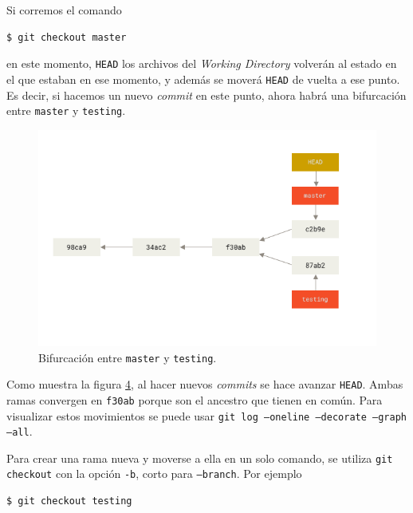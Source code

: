 \documentclass[spanish, 12pt, a4paper]{article}
\begin{document}
Si corremos el comando

\begin{lstlisting}
$ git checkout master
\end{lstlisting}

en este momento, \passthrough{\lstinline!HEAD!} los archivos del
\emph{Working Directory} volverán al estado en el que estaban en ese
momento, y además se moverá \passthrough{\lstinline!HEAD!} de vuelta a
ese punto. Es decir, si hacemos un nuevo \emph{commit} en este punto,
ahora habrá una bifurcación entre \passthrough{\lstinline!master!} y
\passthrough{\lstinline!testing!}.

\begin{figure}
\centering
\includegraphics{figs/advance-master.png}
\caption{Bifurcación entre \passthrough{\lstinline!master!} y
\passthrough{\lstinline!testing!}.{}}
\end{figure}

Como muestra la figura \protect\hyperlink{fig:bifurcacion}{4}, al hacer
nuevos \emph{commits} se hace avanzar \passthrough{\lstinline!HEAD!}.
Ambas ramas convergen en \passthrough{\lstinline!f30ab!} porque son el
ancestro que tienen en común. Para visualizar estos movimientos se puede
usar \passthrough{\lstinline!git log –oneline –decorate –graph –all!}.

Para crear una rama nueva y moverse a ella en un solo comando, se
utiliza \passthrough{\lstinline!git checkout!} con la opción
\passthrough{\lstinline!-b!}, corto para
\passthrough{\lstinline!–branch!}. Por ejemplo

\begin{lstlisting}
$ git checkout testing
\end{lstlisting}
\end{document}
